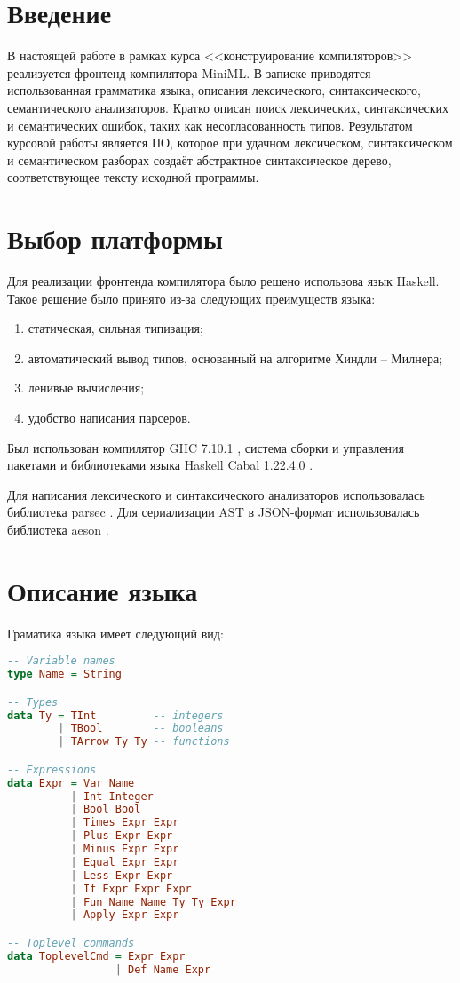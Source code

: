 \documentclass[a4paper,12pt]{article}
\numberwithin{equation}{section}
\begin{document}
\tableofcontents

\section{Введение}
В настоящей работе в рамках курса <<конструирование компиляторов>>
реализуется фронтенд компилятора MiniML. В записке приводятся
использованная грамматика языка, описания лексического,
синтаксического, семантического анализаторов. Кратко описан поиск
лексических, синтаксических и семантических ошибок, таких как
несогласованность типов. Результатом курсовой работы является ПО,
которое при удачном лексическом, синтаксическом и семантическом
разборах создаёт абстрактное синтаксическое дерево, соответствующее
тексту исходной программы.

\section{Выбор платформы} 
Для реализации фронтенда компилятора было решено использова язык
Haskell. Такое решение было принято из-за следующих преимуществ языка:
\begin{enumerate}
\item статическая, сильная типизация;
\item автоматический вывод типов, основанный на алгоритме Хиндли -- Милнера;
\item ленивые вычисления;
\item удобство написания парсеров.
\end{enumerate}
Был использован компилятор GHC 7.10.1 \cite{ghc}, система сборки и управления
пакетами и библиотеками языка Haskell Cabal 1.22.4.0 \cite{cabal}.


Для написания лексического и синтаксического анализаторов использовалась
библиотека parsec \cite{parsec}. Для сериализации AST в JSON-формат
использовалась библиотека aeson \cite{aeson}.

\section{Описание языка}
Граматика языка имеет следующий вид:

\begin{lstlisting}[language=haskell]
-- Variable names
type Name = String

-- Types
data Ty = TInt         -- integers
        | TBool        -- booleans
        | TArrow Ty Ty -- functions

-- Expressions
data Expr = Var Name
          | Int Integer
          | Bool Bool
          | Times Expr Expr
          | Plus Expr Expr
          | Minus Expr Expr
          | Equal Expr Expr
          | Less Expr Expr
          | If Expr Expr Expr
          | Fun Name Name Ty Ty Expr
          | Apply Expr Expr

-- Toplevel commands
data ToplevelCmd = Expr Expr
                 | Def Name Expr
\end{lstlisting}
\end{document}
